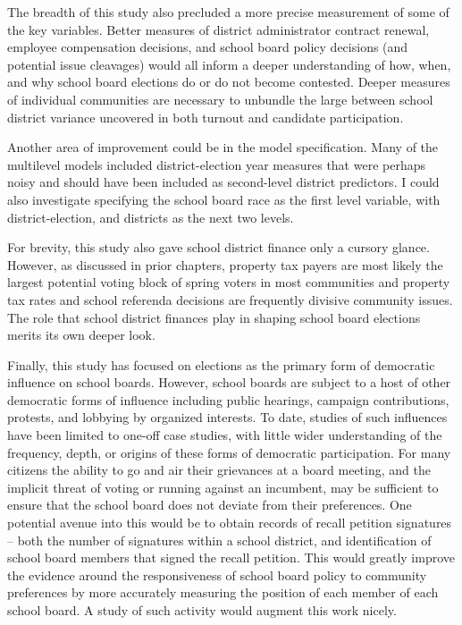 The breadth of this study also precluded a more precise measurement of some of 
the key variables. Better measures of district administrator contract renewal, 
employee compensation decisions, and school board policy decisions (and potential 
issue cleavages) would all inform a deeper understanding of how, when, and why 
school board elections do or do not become contested. Deeper measures of 
individual communities are necessary to unbundle the large between school district 
variance uncovered in both turnout and candidate participation. 

Another area of improvement could be in the model specification. Many of the 
multilevel models included district-election year measures that were perhaps 
noisy and should have been included as second-level district predictors. I could 
also investigate specifying the school board race as the first level variable, 
with district-election, and districts as the next two levels. 

For brevity, this study also gave school district finance only a cursory glance. 
However, as discussed in prior chapters, property tax payers are most likely the 
largest potential voting block of spring voters in most communities and property 
tax rates and school referenda decisions are frequently divisive community issues. 
The role that school district finances play in shaping 
school board elections merits its own deeper look. 

Finally, this study has focused on elections as the primary form of democratic 
influence on school boards. However, school boards are subject to a host of other 
democratic forms of influence including public hearings, campaign contributions, 
protests, and lobbying by organized interests. To date, studies of such influences 
have been limited to one-off case studies, with little wider understanding of the 
frequency, depth, or origins of these forms of democratic participation. For many 
citizens the ability to go and air their grievances at a board meeting, and the 
implicit threat of voting or running against an incumbent, may be sufficient to 
ensure that the school board does not deviate from their preferences. One potential 
avenue into this would be to obtain records of recall petition signatures -- both 
the number of signatures within a school district, and identification of school 
board members that signed the recall petition. This would greatly improve the 
evidence around the responsiveness of school board policy to community preferences 
by more accurately measuring the position of each member of each school board. A 
study of such activity would augment this work nicely. 

